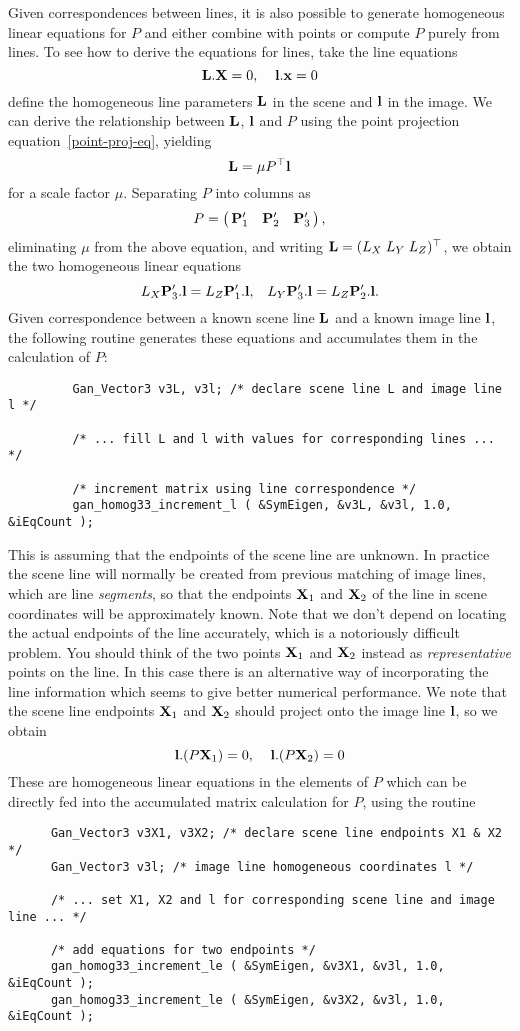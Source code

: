 Given correspondences between lines, it is also possible to generate
homogeneous linear equations for $P$ and either combine with points or
compute $P$ purely from lines. To see how to derive the equations for
lines, take the line equations
\[ \Lvec.\Xvec = 0,\;\;\;\;\lvec.\xvec = 0
\]
define the homogeneous line parameters $\Lvec$ in the scene and $\lvec$ in
the image. We can derive the relationship between $\Lvec$, $\lvec$ and $P$
using the point projection equation~\ref{point-proj-eq}, yielding
\[ \Lvec = \mu P\tr \lvec
\]
for a scale factor $\mu$. Separating $P$ into columns as
\[ P = \beginm{ccc} \Pvec'_1 & \Pvec'_2 & \Pvec'_3 \endm,
\]
eliminating $\mu$ from the above equation, and writing
$\Lvec = (L_X\;L_Y\;L_Z)\tr$, we obtain the two homogeneous linear equations
\[ L_X \Pvec'_3.\lvec = L_Z \Pvec'_1.\lvec,\;\;\;
   L_Y \Pvec'_3.\lvec = L_Z \Pvec'_2.\lvec.
\]
Given correspondence between a known scene line $\Lvec$ and a known image
line $\lvec$, the following routine generates these equations and
accumulates them in the calculation of $P$:
\begin{verbatim}
         Gan_Vector3 v3L, v3l; /* declare scene line L and image line l */

         /* ... fill L and l with values for corresponding lines ... */

         /* increment matrix using line correspondence */
         gan_homog33_increment_l ( &SymEigen, &v3L, &v3l, 1.0, &iEqCount );
\end{verbatim}

This is assuming that the endpoints of the scene line are unknown. In practice
the scene line will normally be created from previous matching of image
lines, which are line {\em segments}, so that the endpoints $\Xvec_1$ and
$\Xvec_2$ of the line in scene coordinates will be approximately known.
Note that we don't depend on locating the actual endpoints of the line
accurately, which is a notoriously difficult problem. You should think of
the two points $\Xvec_1$ and $\Xvec_2$ instead as {\em representative}
points on the line. In this case
there is an alternative way of incorporating the line information which
seems to give better numerical performance. We note that the scene line
endpoints $\Xvec_1$ and $\Xvec_2$ should project onto the image line $\lvec$,
so we obtain
\[ \lvec.(P\Xvec_1) = 0,\;\;\;\;\lvec.(P\Xvec_2) = 0
\]
These are homogeneous linear equations in the elements of $P$
which can be directly fed into the
accumulated matrix calculation for $P$, using the routine
\begin{verbatim}
      Gan_Vector3 v3X1, v3X2; /* declare scene line endpoints X1 & X2 */
      Gan_Vector3 v3l; /* image line homogeneous coordinates l */

      /* ... set X1, X2 and l for corresponding scene line and image line ... */

      /* add equations for two endpoints */
      gan_homog33_increment_le ( &SymEigen, &v3X1, &v3l, 1.0, &iEqCount );
      gan_homog33_increment_le ( &SymEigen, &v3X2, &v3l, 1.0, &iEqCount );
\end{verbatim}

